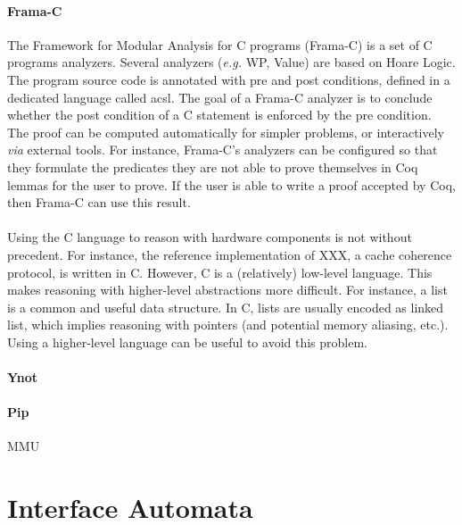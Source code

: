 \paragraph{Frama-C}
%
The Framework for Modular Analysis for C programs (Frama-C) is a set of C
programs analyzers.
%
Several analyzers (\emph{e.g.} WP, Value) are based on Hoare Logic.
%
The program source code is annotated with pre and post conditions, defined in a
dedicated language called \ac{acsl}.
%
The goal of a Frama-C analyzer is to conclude whether the post condition of a C
statement is enforced by the pre condition.
%
The proof can be computed automatically for simpler problems, or interactively
\emph{via} external tools.
%
For instance, Frama-C's analyzers can be configured so that they formulate the
predicates they are not able to prove themselves in Coq lemmas for the user to
prove.
%
If the user is able to write a proof accepted by Coq, then Frama-C can use this
result.

\paragraph{}
%
Using the C language to reason with hardware components is not without precedent.
%
For instance, the reference implementation of XXX, a cache coherence protocol, is written in C.
%
However, C is a (relatively) low-level language.
%
This makes reasoning with higher-level abstractions more difficult.
%
For instance, a list is a common and useful data structure.
%
In C, lists are usually encoded as linked list, which implies reasoning with
pointers (and potential memory aliasing, etc.).
%
Using a higher-level language can be useful to avoid this problem.

\paragraph{Ynot}

\paragraph{Pip}
%
MMU\,\cite{jomaa2016mmu}

\section{Interface Automata} %

